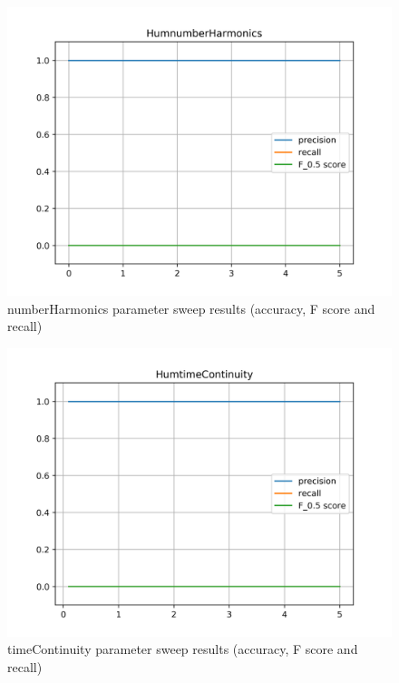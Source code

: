 \begin{figure}[!ht]
	\includegraphics[clip,width=\columnwidth]{Figures/HumnumberHarmonics.png}%
	\caption{numberHarmonics parameter sweep results (accuracy, F score and recall)}
	\label{fig:accomp}
\end{figure}

\begin{figure}[!ht]
	\includegraphics[clip,width=\columnwidth]{Figures/HumtimeContinuity.png}%
	\caption{timeContinuity parameter sweep results (accuracy, F score and recall)}
	\label{fig:accomp}
\end{figure}

